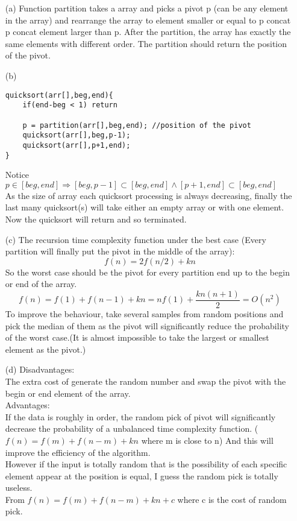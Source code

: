\documentclass[10pt,twoside,a4paper]{article}
\begin{document}
\begin{itemize}
\item[(a)]
Function partition takes a array and picks a pivot p (can be any element in the array) and rearrange the array to {element smaller or equal to p} concat {p} concat {element larger than p}. After the partition, the array has exactly the same elements with different order.
The partition should return the position of the pivot.
\item[(b)]
\begin{lstlisting}
quicksort(arr[],beg,end){
	if(end-beg < 1) return 
	
	p = partition(arr[],beg,end); //position of the pivot
	quicksort(arr[],beg,p-1);
	quicksort(arr[],p+1,end);
}
\end{lstlisting}
Notice $p\in [beg,end] \Rightarrow [beg,p-1] \subset [beg,end] \wedge [p+1,end] \subset [beg,end]$ \\
As the size of array each quicksort processing is always decreasing, finally the last many quicksort(s) will take either an empty array or with one element. Now the quicksort will return and so terminated.
\item[(c)]
The recursion time complexity function under the best case (Every partition will finally put the pivot in the middle of the array):
$$f(n)=2f(n/2)+kn$$
So the worst case should be the pivot for every partition end up to the begin or end of the array.
$$f(n)=f(1)+f(n-1)+kn=nf(1) + \frac{kn(n+1)}{2}=O(n^2)$$
To improve the behaviour, take several samples from random positions and pick the median of them as the pivot will significantly reduce the probability of the worst case.(It is almost impossible to take the largest or smallest element as the pivot.)
\item[(d)]
Disadvantages:\\
The extra cost of generate the random number and swap the pivot with the begin or end element of the array.\\
Advantages:\\
If the data is roughly in order, the random pick of pivot will significantly decrease the probability of a unbalanced time complexity function. ($f(n)=f(m)+f(n-m)+kn$ where m is close to n) And this will improve the efficiency of the algorithm.\\
However if the input is totally random that is the possibility of each specific element appear at the position is equal, I guess the random pick is totally useless.\\
From $f(n)=f(m)+f(n-m)+kn+c$ where c is the cost of random pick.\\

\end{itemize}
\end{document}
